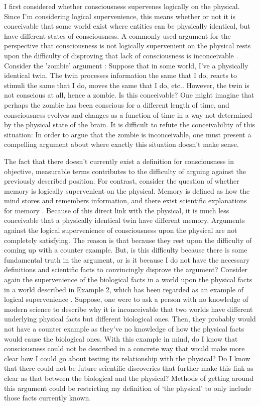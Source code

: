\documentclass{article}
\begin{document}
I first considered whether consciousness supervenes logically on the physical. Since I'm considering logical supervenience, this means whether or not it is conceivable that some world exist where entities can be physically identical, but have different states of consciousness.
A commonly used argument for the perspective that consciousness is not logically supervenient on the physical rests upon the difficulty of disproving that lack of consciousness is inconceivable \cite{chalmers1996conscious}. Consider the ’zombie’ argument \cite{chalmers1996conscious}: Suppose that in some world, I've a physically identical twin. The twin processes information the same that I do, reacts to stimuli the same that I do, moves the same that I do, etc.. However, the twin is not conscious at all, hence a zombie. Is this conceivable? One might imagine that perhaps the zombie has been conscious for a different length of time, and consciousness evolves and changes as a function of time in a way not determined by the physical state of the brain. It is difficult to refute the conceivability of this situation: In order to argue that the zombie is inconceivable, one must present a compelling argument about where exactly this situation doesn’t make sense.
 
The fact that there doesn't currently exist a definition for consciousness in objective, measurable terms contributes to the difficulty of arguing against the previously described position. For contrast, consider the question of whether memory is logically supervenient on the physical. Memory is defined as how the mind stores and remembers information, and there exist scientific explanations for memory \cite{news2016memory}. Because of this direct link with the physical, it is much less conceivable that a physically identical twin have different memory.
Arguments against the logical supervenience of consciousness upon the physical are not completely satisfying. The reason is that because they rest upon the difficulty of coming up with a counter example.  But, is this difficulty because there is some fundamental truth in the argument, or is it because I do not have the necessary definitions and scientific facts to convincingly disprove the argument? Consider again the supervenience of the biological facts in a world upon the physical facts in a world described in Example 2, which has been regarded as an example of logical supervenience \cite{chalmers1996conscious}. Suppose, one were to ask a person with no knowledge of modern science to describe why it is inconceivable that two worlds have different underlying physical facts but different biological ones. Then, they probably would not have a counter example as they've no knowledge of how the physical facts would cause the biological ones. With this example in mind, do I know that consciousness could not be described in a concrete way that would make more clear how I could go about testing its relationship with the physical? Do I know that there could not be future scientific discoveries that further make this link as clear as that between the biological and the physical? Methods of getting around this argument could be restricting my definition of ‘the physical’ to only include those facts currently known.
\end{document}
